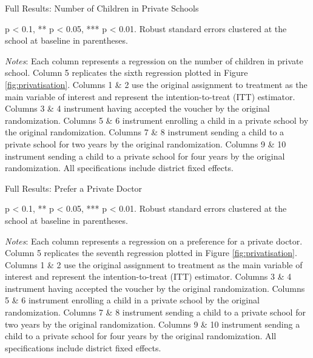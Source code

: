 \documentclass[hidelinks, 12pt, titlepage]{article}
\begin{document}
\begin{landscape}
				\begin{table}
					\begin{threeparttable}
						\centering
						\caption{Full Results: Number of Children in Private Schools\label{table:appendixnumberprivateschools}}
						
						\begin{tablenotes}
							\item * p < 0.1, ** p < 0.05, *** p < 0.01. Robust standard errors clustered at the school at baseline in parentheses.
							\item \emph{Notes}: Each column represents a regression on the number of children in private school.  Column 5 replicates the sixth regression plotted in Figure \ref{fig:privatisation}.  Columns 1 \& 2 use the original assignment to treatment as the main variable of interest and represent the intention-to-treat (ITT) estimator.  Columns 3 \& 4 instrument having accepted the voucher by the original randomization.  Columns 5 \& 6 instrument enrolling a child in a private school by the original randomization.  Columns 7 \& 8 instrument sending a child to a private school for two years by the original randomization.  Columns 9 \& 10 instrument sending a child to a private school for four years by the original randomization.  All specifications include district fixed effects.
						\end{tablenotes}
					\end{threeparttable}
				\end{table}

				\clearpage

				\begin{table}
					\begin{threeparttable}
						\centering
						\caption{Full Results: Prefer a Private Doctor\label{table:appendixpreferprivatedoctor}}
						
						\begin{tablenotes}
							\item * p < 0.1, ** p < 0.05, *** p < 0.01. Robust standard errors clustered at the school at baseline in parentheses.
							\item \emph{Notes}: Each column represents a regression on a preference for a private doctor.  Column 5 replicates the seventh regression plotted in Figure \ref{fig:privatisation}.  Columns 1 \& 2 use the original assignment to treatment as the main variable of interest and represent the intention-to-treat (ITT) estimator.  Columns 3 \& 4 instrument having accepted the voucher by the original randomization.  Columns 5 \& 6 instrument enrolling a child in a private school by the original randomization.  Columns 7 \& 8 instrument sending a child to a private school for two years by the original randomization.  Columns 9 \& 10 instrument sending a child to a private school for four years by the original randomization.  All specifications include district fixed effects.
						\end{tablenotes}
					\end{threeparttable}
				\end{table}

				\end{landscape}
\end{document}
